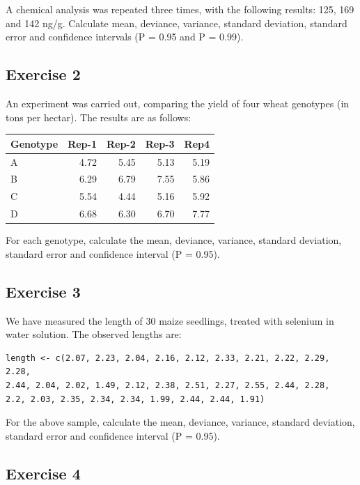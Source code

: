 \documentclass[a4paper,12pt,oneside]{book}
\begin{document}
A chemical analysis was repeated three times, with the following results: 125, 169 and 142 ng/g. Calculate mean, deviance, variance, standard deviation, standard error and confidence intervals (P = 0.95 and P = 0.99).

\hypertarget{exercise-2-2}{%
\subsection{Exercise 2}\label{exercise-2-2}}

An experiment was carried out, comparing the yield of four wheat genotypes (in tons per hectar). The results are as follows:

\begin{tabular}{l|r|r|r|r}
\hline
Genotype & Rep-1 & Rep-2 & Rep-3 & Rep4\\
\hline
A & 4.72 & 5.45 & 5.13 & 5.19\\
\hline
B & 6.29 & 6.79 & 7.55 & 5.86\\
\hline
C & 5.54 & 4.44 & 5.16 & 5.92\\
\hline
D & 6.68 & 6.30 & 6.70 & 7.77\\
\hline
\end{tabular}

For each genotype, calculate the mean, deviance, variance, standard deviation, standard error and confidence interval (P = 0.95).

\hypertarget{exercise-3-2}{%
\subsection{Exercise 3}\label{exercise-3-2}}

We have measured the length of 30 maize seedlings, treated with selenium in water solution. The observed lengths are:

\begin{verbatim}
length <- c(2.07, 2.23, 2.04, 2.16, 2.12, 2.33, 2.21, 2.22, 2.29, 2.28, 
2.44, 2.04, 2.02, 1.49, 2.12, 2.38, 2.51, 2.27, 2.55, 2.44, 2.28, 
2.2, 2.03, 2.35, 2.34, 2.34, 1.99, 2.44, 2.44, 1.91)
\end{verbatim}

For the above sample, calculate the mean, deviance, variance, standard deviation, standard error and confidence interval (P = 0.95).

\hypertarget{exercise-4-1}{%
\subsection{Exercise 4}\label{exercise-4-1}}
\end{document}
